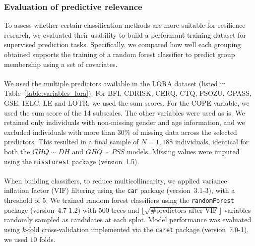 \documentclass[12pt]{article}
\begin{document}
\subsubsection{Evaluation of predictive relevance}
To assess whether certain classification methods are more suitable for resilience research, we evaluated their usability to build a performant training dataset for supervised prediction tasks. Specifically, we compared how well each grouping obtained supports the training of a random forest classifier to predict group membership using a set of covariates.\\
\\
We used the multiple predictors available in the LORA dataset (listed in Table~\ref{table:variables_lora}). For BFI, CDRISK, CERQ, CTQ, FSOZU, GPASS, GSE, IELC, LE and LOTR, we used the sum scores. For the COPE variable, we used the sum score of the 14 subscales. The other variables were used as is. We retained only individuals with non-missing gender and age information, and we excluded individuals with more than 30\% of missing data across the selected predictors. This resulted in a final sample of \( N = 1{,}188 \) individuals, identical for both the $GHQ\sim DH$ and $GHQ\sim PSS$  models. Missing values were imputed using the \texttt{missForest} package (version~1.5).\\
\\
When building classifiers, to reduce multicollinearity, we applied variance inflation factor (VIF) filtering using the \texttt{car} package (version~3.1-3), with a threshold of 5. We trained random forest classifiers using the \texttt{randomForest} package (version~4.7-1.2) with $500$ trees and $\lfloor\sqrt{\text{\#predictors after VIF}} \rfloor$ variables randomly sampled as candidates at each splot. Model performance was evaluated using \( k \)-fold cross-validation implemented via the \texttt{caret} package (version~7.0-1), we used $10$ folds.
\end{document}

